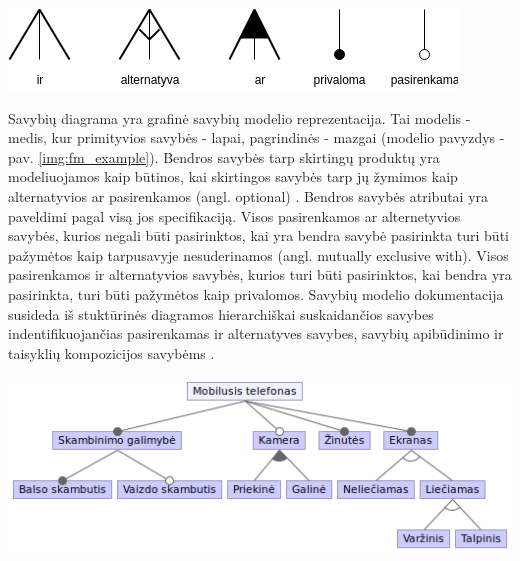 \documentclass{VUMIFPSkursinis}
\begin{document}
\begin{center}
    \includegraphics[scale=0.75]{img/feature_model_rules}
    \label{img:fm_rules}

\end{center}

Savybių diagrama yra grafinė savybių modelio reprezentacija. Tai modelis - medis, kur primityvios savybės - lapai, pagrindinės - mazgai (modelio pavyzdys - pav. \ref{img:fm_example}). Bendros savybės tarp skirtingų produktų yra modeliuojamos kaip būtinos, kai skirtingos savybės tarp jų žymimos kaip alternatyvios ar pasirenkamos (angl. optional) \cite{Batory2005}. Bendros savybės atributai yra paveldimi pagal visą jos specifikaciją. Visos pasirenkamos ar alternetyvios savybės, kurios negali būti pasirinktos, kai yra bendra savybė pasirinkta turi būti pažymėtos kaip tarpusavyje nesuderinamos (angl. mutually exclusive with). Visos pasirenkamos ir alternatyvios savybės, kurios turi būti pasirinktos, kai bendra yra pasirinkta, turi būti pažymėtos kaip privalomos. Savybių modelio dokumentacija susideda iš stuktūrinės diagramos hierarchiškai suskaidančios savybes indentifikuojančias pasirenkamas ir alternatyves savybes, savybių apibūdinimo ir taisyklių kompozicijos savybėms \cite{Kang1990}. 

\begin{center}
    \includegraphics[scale=0.6]{img/mobile}
    \label{img:fm_example}
\end{center}
\end{document}
